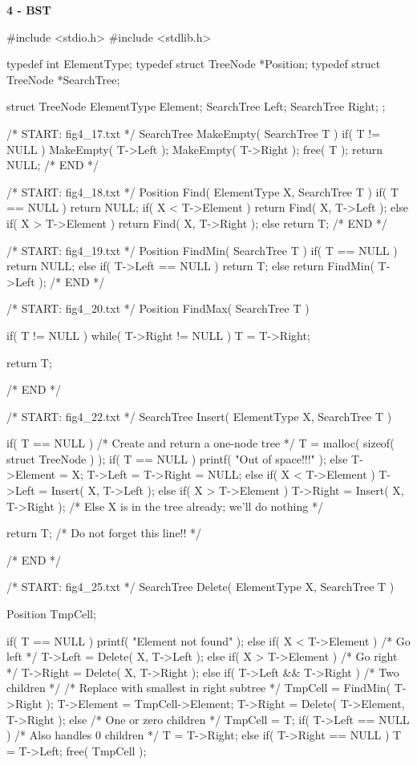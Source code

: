 \documentclass[12pt, a4paper]{article}
\begin{document}
\huge\textbf{4 - BST}
\begin{code}
#include <stdio.h>
#include <stdlib.h>

typedef int ElementType;
typedef struct TreeNode *Position;
typedef struct TreeNode *SearchTree;

struct TreeNode
{
	ElementType Element;
	SearchTree  Left;
	SearchTree  Right;
};

/* START: fig4_17.txt */
SearchTree MakeEmpty( SearchTree T )
{
	if( T != NULL )
	{
		MakeEmpty( T->Left );
		MakeEmpty( T->Right );
		free( T );
	}
	return NULL;
}
/* END */

/* START: fig4_18.txt */
Position Find( ElementType X, SearchTree T )
{
	if( T == NULL )
		return NULL;
	if( X < T->Element )
		return Find( X, T->Left );
	else if( X > T->Element )
		return Find( X, T->Right );
	else
		return T;
}
/* END */

/* START: fig4_19.txt */
Position FindMin( SearchTree T )
{
	if( T == NULL )
		return NULL;
	else if( T->Left == NULL )
		return T;
	else
		return FindMin( T->Left );
}
/* END */

/* START: fig4_20.txt */
Position FindMax( SearchTree T )
{
	if( T != NULL )
	while( T->Right != NULL )
		T = T->Right;

	return T;
}
/* END */

/* START: fig4_22.txt */
SearchTree Insert( ElementType X, SearchTree T )
{
	if( T == NULL )
	{
		/* Create and return a one-node tree */
		T = malloc( sizeof( struct TreeNode ) );
		if( T == NULL )
			printf( "Out of space!!!" );
		else
		{
			T->Element = X;
			T->Left = T->Right = NULL;
		}
	}
	else if( X < T->Element )
		T->Left = Insert( X, T->Left );
	else if( X > T->Element )
		T->Right = Insert( X, T->Right );
	/* Else X is in the tree already; we'll do nothing */

	return T;  /* Do not forget this line!! */
}
/* END */

/* START: fig4_25.txt */
SearchTree Delete( ElementType X, SearchTree T )
{
	Position TmpCell;

	if( T == NULL )
		printf( "Element not found" );
	else if( X < T->Element )  /* Go left */
		T->Left = Delete( X, T->Left );
	else if( X > T->Element )  /* Go right */
		T->Right = Delete( X, T->Right );
	else if( T->Left && T->Right )  /* Two children */
	{
		/* Replace with smallest in right subtree */
		TmpCell = FindMin( T->Right );
		T->Element = TmpCell->Element;
		T->Right = Delete( T->Element, T->Right );
	}
	else  /* One or zero children */
	{
		TmpCell = T;
		if( T->Left == NULL ) /* Also handles 0 children */
			T = T->Right;
		else if( T->Right == NULL )
			T = T->Left;
		free( TmpCell );
	}

}
\end{code}
\end{document}

